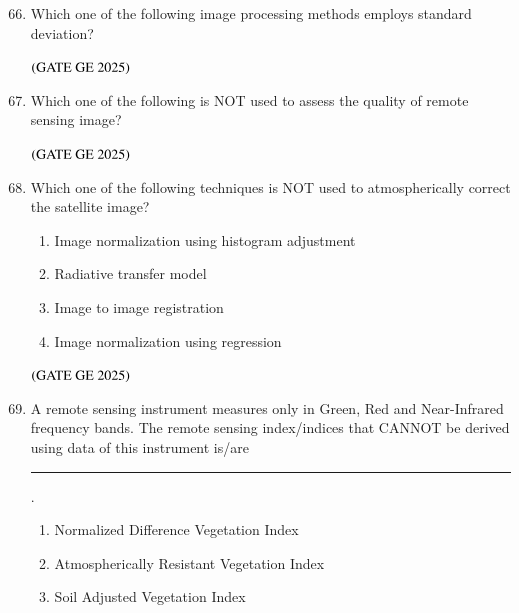 \documentclass[journal,12pt,onecolumn]{IEEEtran}
\theoremstyle{remark}
\begin{document}
\begin{enumerate}
\setcounter{enumi}{65}
\item Which one of the following image processing methods employs standard deviation?
\begin{enumerate}
\end{enumerate}
\hfill $\left(\text{GATE GE 2025}\right)$
\bigskip
\item Which one of the following is NOT used to assess the quality of remote sensing image?
\begin{enumerate}
\end{enumerate}
\hfill $\left(\text{GATE GE 2025}\right)$
\bigskip
\item Which one of the following techniques is NOT used to atmospherically correct the satellite image?
\begin{enumerate}
\item Image normalization using histogram adjustment
\item Radiative transfer model
\item Image to image registration
\item Image normalization using regression
\end{enumerate}
\hfill $\left(\text{GATE GE 2025}\right)$
\bigskip
\item A remote sensing instrument measures only in Green, Red and Near-Infrared frequency bands. The remote sensing index/indices that CANNOT be derived using data of this instrument is/are \rule{2cm}{0.5mm}.
\begin{enumerate}
\item Normalized Difference Vegetation Index
\item Atmospherically Resistant Vegetation Index
\item Soil Adjusted Vegetation Index

\end{enumerate}
\end{enumerate}
\end{document}
